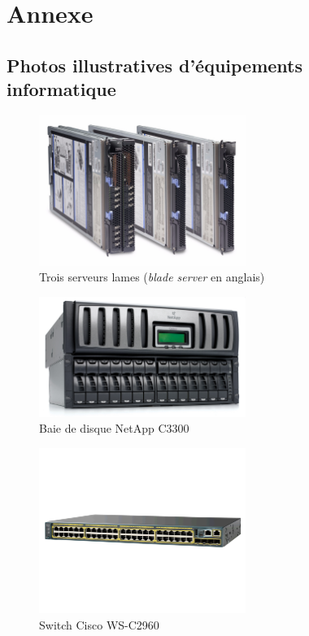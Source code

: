 \part{Annexe}

\chapter{Photos illustratives d'équipements informatique}
\label{rack}

\begin{figure}[H]
	\centering
	\includegraphics[width=0.6\textwidth]{resource/img/blade}
	\caption{Trois serveurs lames (\emph{blade server} en anglais)}
\end{figure}

\begin{figure}[H]
	\centering
	\includegraphics[width=0.6\textwidth]{resource/img/netapp_c3300}
	\caption{Baie de disque NetApp C3300}
\end{figure}

\begin{figure}[H]
	\centering
	\includegraphics[width=0.6\textwidth]{resource/img/cisco-switch}
	\caption{Switch Cisco WS-C2960}
\end{figure}

